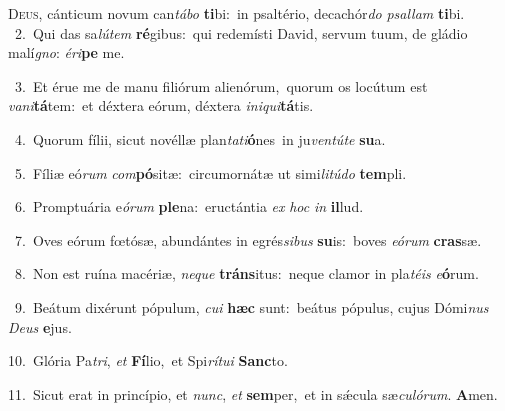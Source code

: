 \lettrine{\initial\textcolor{\initialcolor}{D}}{eus,} cánticum novum can\-\textit{tá}\-\textit{bo} \textbf{ti}\-bi:~\star in psaltério, decachór\textit{do} \textit{psal}\-\textit{lam} \textbf{ti}\-bi.\\
{\numbfont\textcolor{\numbcolor}{~2.}}~Qui das sa\-\textit{lú}\-\textit{tem} \textbf{ré}\-gibus:~\star qui redemísti David, servum tuum, de gládio malí\-\textit{gno}\-: \textit{é}\-\textit{ri}\textbf{pe} me.\par
{\numbfont\textcolor{\numbcolor}{~3.}}~Et érue me de manu filiórum alienórum,~\dagger quorum os locútum est \textit{va}\-\textit{ni}\textbf{tá}tem:~\star et déxtera eórum, déxtera \textit{in}\-\textit{i}\textit{qui}\textbf{tá}tis.\par
{\numbfont\textcolor{\numbcolor}{~4.}}~Quorum fílii, sicut novéllæ plan\-\textit{ta}\-\textit{ti}\textbf{ó}nes~\star in ju\-\textit{ven}\-\textit{tú}\textit{te} \textbf{su}\-a.\par
{\numbfont\textcolor{\numbcolor}{~5.}}~Fíliæ eó\textit{rum} \textit{com}\-\textbf{pó}sitæ:~\star circumornátæ ut simi\-\textit{li}\-\textit{tú}\textit{do} \textbf{tem}\-pli.\par
{\numbfont\textcolor{\numbcolor}{~6.}}~Promptuária e\-\textit{ó}\-\textit{rum} \textbf{ple}\-na:~\star eructántia \textit{ex} \textit{hoc} \textit{in} \textbf{il}\-lud.\par
{\numbfont\textcolor{\numbcolor}{~7.}}~Oves eórum fœtósæ, abundántes in egrés\-\textit{si}\-\textit{bus} \textbf{su}\-is:~\star boves \textit{e}\-\textit{ó}\textit{rum} \textbf{cras}\-sæ.\par
{\numbfont\textcolor{\numbcolor}{~8.}}~Non est ruína macériæ, \textit{ne}\-\textit{que} \textbf{tráns}\-itus:~\star neque clamor in pla\-\textit{té}\-\textit{is} \textit{e}\-\textbf{ó}rum.\par
{\numbfont\textcolor{\numbcolor}{~9.}}~Beátum dixérunt pópulum, \textit{cu}\-\textit{i} \textbf{hæc} sunt:~\star beátus pópulus, cujus Dómi\textit{nus} \textit{De}\-\textit{us} \textbf{e}\-jus.\par
{\numbfont\textcolor{\numbcolor}{10.}}~Glória Pa\-\textit{tri}\-, \textit{et} \textbf{Fí}\-lio,~\star et Spi\-\textit{rí}\-\textit{tu}\textit{i} \textbf{Sanc}\-to.\par
{\numbfont\textcolor{\numbcolor}{11.}}~Sicut erat in princípio, et \textit{nunc}\-, \textit{et} \textbf{sem}\-per,~\star et in sǽcula sæ\-\textit{cu}\-\textit{ló}\textit{rum}. \textbf{A}\-men.\par
